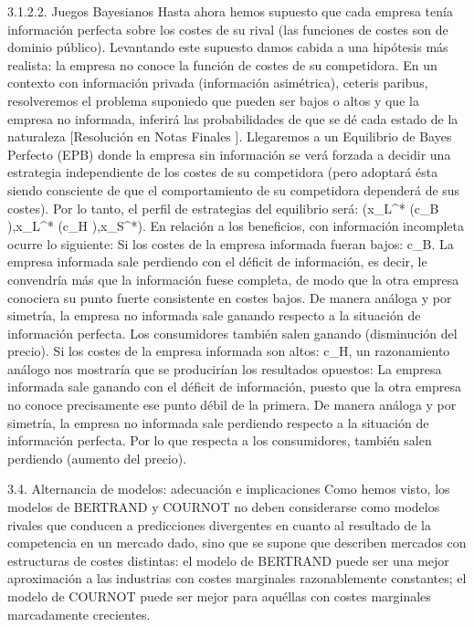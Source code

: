 \documentclass[10pt,a4paper]{article}
\begin{document}
3.1.2.2. Juegos Bayesianos
Hasta ahora hemos supuesto que cada empresa tenía información perfecta sobre los costes de su rival (las funciones de costes son de dominio público). Levantando este supuesto damos cabida a una hipótesis más realista: la empresa no conoce la función de costes de su competidora. En un contexto con información privada (información asimétrica), ceteris paribus, resolveremos el problema suponiedo que pueden ser bajos o altos y que  la empresa no informada, inferirá las probabilidades de que se dé cada estado de la naturaleza [Resolución en Notas Finales ].
Llegaremos a un Equilibrio de Bayes Perfecto (EPB) donde la empresa sin información se verá forzada a decidir una estrategia independiente de los costes de su competidora (pero adoptará ésta siendo consciente de que el comportamiento de su competidora dependerá de sus costes). Por lo tanto, el perfil de estrategias del equilibrio será: (x_L^* (c_B ),x_L^* (c_H ),x_S^*).
En relación a los beneficios, con información incompleta ocurre lo siguiente:
	Si los costes de la empresa informada fueran bajos: c_B. 
	La empresa informada sale perdiendo con el déficit de información, es decir, le convendría más que la información fuese completa, de modo que la otra empresa conociera su punto fuerte consistente en costes bajos. 
	De manera análoga y por simetría, la empresa no informada sale ganando respecto a la situación de información perfecta.
	Los consumidores también salen ganando (disminución del precio).
	Si los costes de la empresa informada son altos: c_H, un razonamiento análogo nos mostraría que se producirían los resultados opuestos:
	La empresa informada sale ganando con el déficit de información, puesto que la otra empresa no conoce precisamente ese punto débil de la primera.
	De manera análoga y por simetría, la empresa no informada sale perdiendo respecto a la situación de información perfecta.
	Por lo que respecta a los consumidores, también salen perdiendo (aumento del precio).
 
3.4. Alternancia de modelos: adecuación e implicaciones
Como hemos visto, los modelos de BERTRAND y COURNOT no deben considerarse como modelos rivales que conducen a predicciones divergentes en cuanto al resultado de la competencia en un mercado dado, sino que se supone que describen mercados con estructuras de costes distintas: el modelo de BERTRAND puede ser una mejor aproximación a las industrias con costes marginales razonablemente constantes; el modelo de COURNOT puede ser mejor para aquéllas con costes marginales marcadamente crecientes.
\end{document}
